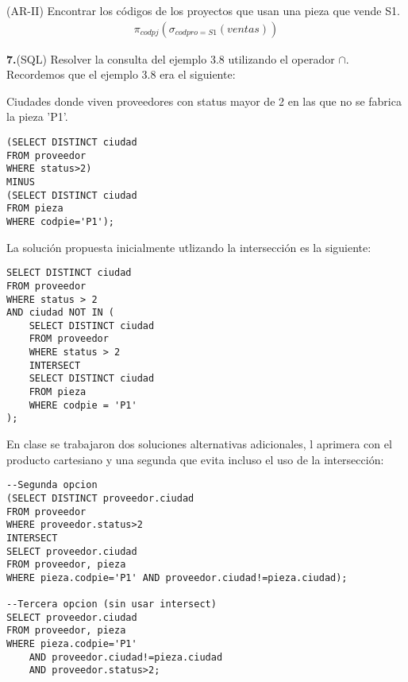 \documentclass[12pt]{article}
\begin{document}
\portada[%
        titulo=Fundamentos de Bases de Datos,
        subtitulo=Ejercicio 7 (AR-II) y Ejercicio 3.7 (SQL),
        autor=Jesús Muñoz Velasco,
        año=Curso 2024-2025]

\setcounter{ejercicio}{6}

\begin{ejercicio}(AR-II)
    Encontrar los códigos de los proyectos que usan una pieza que vende S1.
    \begin{align*}
        \pi_{codpj}(\sigma_{codpro=S1}(ventas))
    \end{align*}
\end{ejercicio}

\setcounter{ejercicio}{2}
\begin{ejercicio}\hspace{-0.15cm}\textbf{7.}(SQL) Resolver la consulta del ejemplo 3.8 utilizando el operador $\cap$.
    \endsquare
Recordemos que el ejemplo 3.8 era el siguiente:

Ciudades donde viven proveedores con status mayor 
de 2 en las que no se fabrica la pieza 'P1'.


\begin{verbatim}
(SELECT DISTINCT ciudad
FROM proveedor
WHERE status>2)
MINUS
(SELECT DISTINCT ciudad
FROM pieza
WHERE codpie='P1');
\end{verbatim}
La solución propuesta inicialmente utlizando la intersección es la siguiente:
\begin{verbatim}
SELECT DISTINCT ciudad
FROM proveedor
WHERE status > 2
AND ciudad NOT IN (
    SELECT DISTINCT ciudad
    FROM proveedor
    WHERE status > 2
    INTERSECT
    SELECT DISTINCT ciudad
    FROM pieza
    WHERE codpie = 'P1'
);
\end{verbatim}
En clase se trabajaron dos soluciones alternativas adicionales, l aprimera con el producto cartesiano y una segunda que evita incluso el uso de la intersección:
\begin{verbatim}
--Segunda opcion
(SELECT DISTINCT proveedor.ciudad
FROM proveedor
WHERE proveedor.status>2
INTERSECT
SELECT proveedor.ciudad
FROM proveedor, pieza
WHERE pieza.codpie='P1' AND proveedor.ciudad!=pieza.ciudad);

--Tercera opcion (sin usar intersect)
SELECT proveedor.ciudad
FROM proveedor, pieza
WHERE pieza.codpie='P1' 
    AND proveedor.ciudad!=pieza.ciudad 
    AND proveedor.status>2;

\end{verbatim}
\end{ejercicio}
    
\end{document}
